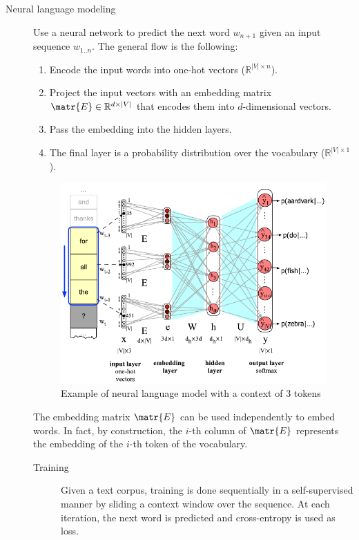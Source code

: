 \begin{description}
    \item[Neural language modeling] 
        Use a neural network to predict the next word $w_{n+1}$ given an input sequence $w_{1..n}$. The general flow is the following:
        \begin{enumerate}
            \item Encode the input words into one-hot vectors ($\mathbb{R}^{|V| \times n}$). 
            \item Project the input vectors with an embedding matrix $\matr{E} \in \mathbb{R}^{d \times |V|}$ that encodes them into $d$-dimensional vectors.
            \item Pass the embedding into the hidden layers.
            \item The final layer is a probability distribution over the vocabulary ($\mathbb{R}^{|V| \times 1}$).
        \end{enumerate}

        \begin{figure}[H]
            \centering
            \includegraphics[width=0.6\linewidth]{./img/_neural_language_model_example.pdf}
            \caption{Example of neural language model with a context of $3$ tokens}
        \end{figure}

        \begin{remark}
            The embedding matrix $\matr{E}$ can be used independently to embed words. In fact, by construction, the $i$-th column of $\matr{E}$ represents the embedding of the $i$-th token of the vocabulary.
        \end{remark}

        \begin{description}
            \item[Training] 
                Given a text corpus, training is done sequentially in a self-supervised manner by sliding a context window over the sequence. At each iteration, the next word is predicted and cross-entropy is used as loss.


\end{description}
\end{description}
